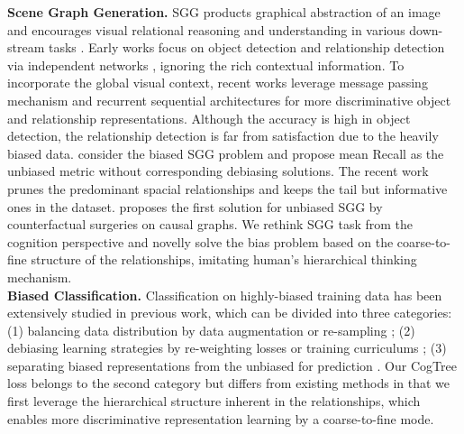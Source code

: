 \documentclass[letterpaper]{article} \usepackage{aaai21}  \usepackage{times}  \usepackage{helvet} \usepackage{courier}  \usepackage[hyphens]{url}  \usepackage{graphicx} \urlstyle{rm} \def\UrlFont{\rm}  \usepackage{natbib}  \usepackage{caption} \frenchspacing  \setlength{\pdfpagewidth}{8.5in}  \setlength{\pdfpageheight}{11in}  \usepackage{amsmath,amsthm}
\begin{document}
\textbf{Scene Graph Generation.}
SGG \cite{xu2017scene} products graphical abstraction of an image and encourages visual relational reasoning and understanding in various down-stream tasks \cite{Zhu2020Mucko,Jiang2020DualVD}. Early works focus on object detection and relationship detection via independent networks \cite{lu2016visual,Zhang2017Relationship}, ignoring the rich contextual information. To incorporate the global visual context, recent works leverage message passing mechanism \cite{xu2017scene,Li2017scene,yang2018graph,li2018factorizable,qi2019attentive,chen2019counterfactual} and recurrent sequential architectures \cite{zellers2018neural,woo2018linknet,tang2019learning} for more discriminative object and relationship representations. Although the accuracy is high in object detection, the relationship detection is far from satisfaction due to the heavily biased data. \cite{chen2019knowledge,tang2019learning} consider the biased SGG problem and propose mean Recall as the unbiased metric without corresponding debiasing solutions. The recent work \cite{Liang2019VRR} prunes the predominant spacial relationships and keeps the tail but informative ones in the dataset. \cite{Tang2020Unbiased} proposes the first solution for unbiased SGG  by counterfactual surgeries on causal graphs. We rethink SGG task from the cognition perspective and novelly  solve the bias problem based on the coarse-to-fine structure of the relationships, imitating human's hierarchical thinking mechanism. 
\\
\textbf{Biased Classification.}
Classification on highly-biased training data has been extensively studied in previous work, which can be divided into three categories: (1) balancing data distribution by data augmentation or re-sampling \cite{burnaev2015influence,Li2018resound,li2019repair}; (2) debiasing learning strategies by re-weighting losses or training curriculums \cite{mikolov2013distributed,huang2016learning,lin2017focal,Cui2019Class}; (3) separating biased representations from the unbiased for prediction \cite{misra2016seeing,cadene2019rubi,Tang2020Unbiased}. Our CogTree loss belongs to the second category but differs from existing methods in that we first leverage the hierarchical structure inherent in the relationships, which enables more discriminative representation learning by a coarse-to-fine mode. 
\end{document}

